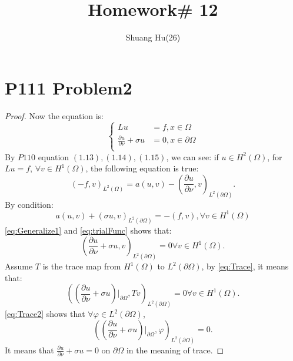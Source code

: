 \documentclass[a4paper]{ctexart}
\title{Homework\# 12}
\author{Shuang Hu(26)}
\newcommand{\pdfFrac}[2]{\frac{\partial #1}{\partial #2}}
\begin{document}
\maketitle
\section*{P111 Problem2}
\begin{proof}
    Now the equation is:
    \begin{equation}
        \label{eq:Poisson3rd}
        \left\{
            \begin{aligned}
                Lu&=f,x\in\Omega\\
                \pdfFrac{u}{\nu}+\sigma u&=0,x\in\partial\Omega\\
            \end{aligned}
        \right.
    \end{equation}
    By $P110$ equation $(1.13),(1.14),(1.15)$, we can see: if $u\in H^{2}(\Omega)$, for $Lu=f$, $\forall v\in H^{1}(\Omega)$, the following equation is true:
    \begin{equation}
        \label{eq:Generalize1}
        (-f,v)_{L^{2}(\Omega)}=a(u,v)-\left(\pdfFrac{u}{\nu},v\right)_{L^{2}(\partial\Omega)}.
    \end{equation}
    By condition:
    \begin{equation}
        \label{eq:trialFunc}
        a(u,v)+(\sigma u,v)_{L^{2}(\partial\Omega)}=-(f,v),\forall v\in H^{1}(\Omega)
    \end{equation}
    \eqref{eq:Generalize1} and \eqref{eq:trialFunc} shows that:
    \begin{equation}
        \label{eq:Trace}
        \left(\pdfFrac{u}{\nu}+\sigma u,v\right)_{L^2(\partial\Omega)}=0\forall v\in H^{1}(\Omega).
    \end{equation}
    Assume $T$ is the trace map from $H^{1}(\Omega)$ to $L^{2}(\partial\Omega)$, by \eqref{eq:Trace}, it means that:
    \begin{equation}
        \label{eq:Trace2}
        \left(\left(\pdfFrac{u}{\nu}+\sigma u\right)|_{\partial\Omega},Tv\right)_{L^2(\partial\Omega)}=0\forall v\in H^{1}(\Omega).
    \end{equation}
    \eqref{eq:Trace2} shows that $\forall \varphi\in L^{2}(\partial\Omega)$,
    \begin{equation}
        \label{eq:Trace3}
        \left(\left(\pdfFrac{u}{\nu}+\sigma u\right)|_{\partial\Omega},\varphi\right)_{L^2(\partial\Omega)}=0.
    \end{equation}
    It means that $\pdfFrac{u}{\nu}+\sigma u=0$ on $\partial \Omega$ in the meaning of trace.
\end{proof}
\end{document}
